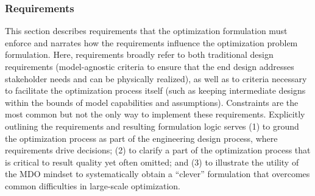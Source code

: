 
\subsubsection{Requirements}\label{sec:requirements}
This section describes requirements that the optimization formulation must enforce and narrates how the requirements influence the optimization problem formulation.
Here, requirements broadly refer to both traditional design requirements (model-agnostic criteria to ensure that the end design addresses stakeholder needs and can be physically realized), as well as to criteria necessary to facilitate the optimization process itself (such as keeping intermediate designs within the bounds of model capabilities and assumptions).
Constraints are the most common but not the only way to implement these requirements.
Explicitly outlining the requirements and resulting formulation logic serves (1) to ground the optimization process as part of the engineering design process, where requirements drive decisions; 
(2) to clarify a part of the optimization process that is critical to result quality yet often omitted; and (3) to illustrate the utility of the MDO mindset to systematically obtain a ``clever'' formulation that overcomes common difficulties in large-scale optimization. 

